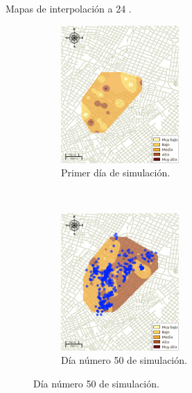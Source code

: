 \begin{frame}[t]{Mapas de interpolación a 24 \textcelsius.}
    \begin{figure}
    \begin{subfigure}[b]{0.45\textwidth}
        \includegraphics[width=4.5cm]{../book/capitulo-6/graphics/raster/temp-24-0.png}
        \caption{ Primer día de simulación.}
    \end{subfigure}
    ~~~~
    \begin{subfigure}[b]{0.45\textwidth}
        \includegraphics[width=4.5cm]{../book/capitulo-6/graphics/raster/temp-24-49.png}
        \caption{Día número 50 de simulación.}
    \end{subfigure}
    \end{figure}
\end{frame}


